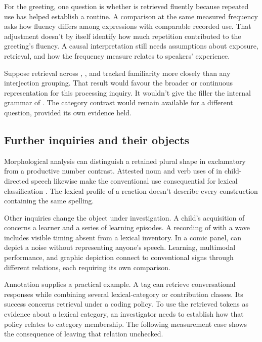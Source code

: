 \documentclass[12pt]{article}
\begin{document}
For the greeting, one question is whether  is
retrieved fluently because repeated use has helped establish a routine.
A comparison at the same measured frequency asks how fluency differs
among expressions with comparable recorded use. That adjustment doesn't
by itself identify how much repetition contributed to the greeting's
fluency. A causal interpretation still needs assumptions about exposure,
retrieval, and how the frequency measure relates to speakers' experience.

Suppose retrieval across , , and
 tracked familiarity more closely than any
interjection grouping. That result would favour the broader or continuous
representation for this processing inquiry. It wouldn't give the filler
 the internal grammar of . The
category contrast would remain available for a different question,
provided its own evidence held.

\subsection{Further inquiries and their objects}

Morphological analysis can distinguish a retained plural shape in
exclamatory  from a productive number contrast. Attested
noun and verb uses of  in child-directed speech likewise
make the conventional use consequential for lexical classification
\citep[36]{stange2016}. The lexical profile of a reaction doesn't describe
every construction containing the same spelling.

Other inquiries change the object under investigation. A child's acquisition
of  concerns a learner and a series of learning episodes.
A recording of  with a wave includes visible timing absent
from a lexical inventory. In a comic panel, 
can depict a noise without representing anyone's speech. Learning,
multimodal performance, and graphic depiction connect to conventional signs
through different relations, each requiring its own comparison.

Annotation supplies a practical example. A tag can retrieve conversational
responses while combining several lexical-category or contribution classes. Its
success concerns retrieval under a coding policy. To use the retrieved
tokens as evidence about a lexical category, an investigator needs
to establish how that policy relates to category membership. The
following measurement case shows the consequence of leaving that relation
unchecked.
\end{document}
